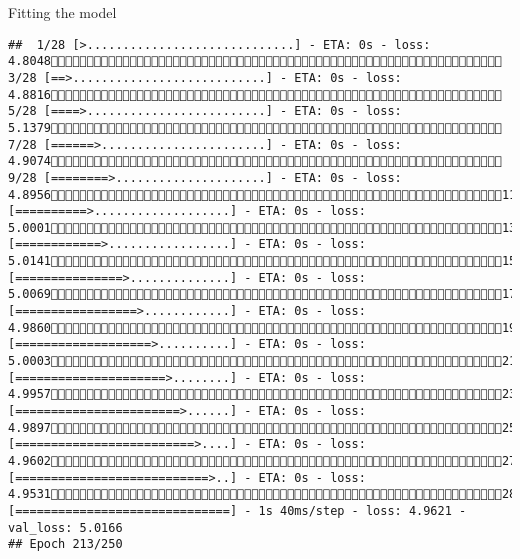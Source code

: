 \documentclass[
  ignorenonframetext,
]{beamer}
\begin{document}
\begin{frame}[fragile]{Fitting the model}
\begin{verbatim}
##  1/28 [>.............................] - ETA: 0s - loss: 4.8048 3/28 [==>...........................] - ETA: 0s - loss: 4.8816 5/28 [====>.........................] - ETA: 0s - loss: 5.1379 7/28 [======>.......................] - ETA: 0s - loss: 4.9074 9/28 [========>.....................] - ETA: 0s - loss: 4.895611/28 [==========>...................] - ETA: 0s - loss: 5.000113/28 [============>.................] - ETA: 0s - loss: 5.014115/28 [===============>..............] - ETA: 0s - loss: 5.006917/28 [=================>............] - ETA: 0s - loss: 4.986019/28 [===================>..........] - ETA: 0s - loss: 5.000321/28 [=====================>........] - ETA: 0s - loss: 4.995723/28 [=======================>......] - ETA: 0s - loss: 4.989725/28 [=========================>....] - ETA: 0s - loss: 4.960227/28 [===========================>..] - ETA: 0s - loss: 4.953128/28 [==============================] - 1s 40ms/step - loss: 4.9621 - val_loss: 5.0166
## Epoch 213/250

\end{verbatim}
\end{frame}
\end{document}
